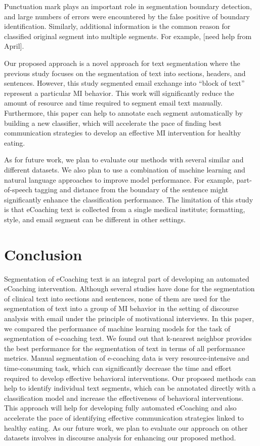 \documentclass{amia}
\begin{document}
Punctuation mark plays an important role in segmentation boundary detection, and large numbers of errors were encountered by the false positive of boundary identification. Similarly, additional information is the common reason for classified original segment into multiple segments. For example, [need help from April].

Our proposed approach is a novel approach for text segmentation where the previous study focuses on the segmentation of text into sections, headers, and sentences. However, this study segmented email exchange into ``block of text'' represent a particular MI behavior. This work will significantly reduce the amount of resource and time required to segment email text manually. Furthermore, this paper can help to annotate each segment automatically by building a new classifier, which will accelerate the pace of finding best communication strategies to develop an effective MI intervention for healthy eating.

As for future work, we plan to evaluate our methods with several similar and different datasets. We also plan to use a combination of machine learning and natural language approaches to improve model performance. For example, part-of-speech tagging and distance from the boundary of the sentence might significantly enhance the classification performance. The limitation of this study is that eCoaching text is collected from a single medical institute; formatting, style, and email segment can be different in other settings.
 
\section*{Conclusion}
Segmentation of eCoaching text is an integral part of developing an automated eCoaching intervention. Although several studies have done for the segmentation of clinical text into sections and sentences, none of them are used for the segmentation of text into a group of MI behavior in the setting of discourse analysis with email under the principle of motivational interviews. In this paper, we compared the performance of machine learning models for the task of segmentation of e-coaching text. We found out that k-nearest neighbor provides the best performance for the segmentation of text in terms of all performance metrics. Manual segmentation of e-coaching data is very resource-intensive and time-consuming task, which can significantly decrease the time and effort required to develop effective behavioral interventions. Our proposed methods can help to identify individual text segments, which can be annotated directly with a classification model and increase the effectiveness of behavioral interventions. This approach will help for developing fully automated eCoaching and also accelerate the pace of identifying effective communication strategies linked to healthy eating. As our future work, we plan to evaluate our approach on other datasets involves in discourse analysis for enhancing our proposed method.  
\end{document}
